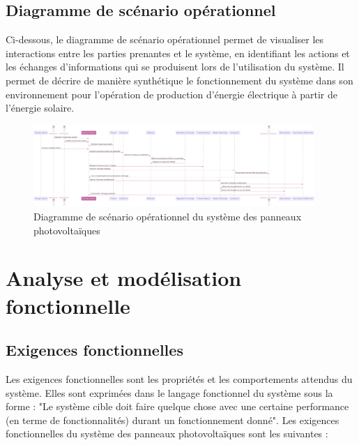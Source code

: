 \documentclass{article}
\begin{document}
\subsection{Diagramme de scénario opérationnel}
Ci-dessous, le diagramme de scénario opérationnel permet de visualiser les interactions entre les parties prenantes et le système, en identifiant les actions et les échanges d'informations qui se produisent lors de l'utilisation du système. Il permet de décrire de manière synthétique le fonctionnement du système dans son environnement pour l'opération de production d'énergie électrique à partir de l'énergie solaire. 
\vspace{10pt}
\begin{figure}[H]
    \centering
    \includegraphics[width=0.95\textwidth]{diagramme_de_scenario_operationnel.png}
    \caption{Diagramme de scénario opérationnel du système des panneaux photovoltaïques}
    \label{fig:diagramme_contexte}
\end{figure}
\vspace{10pt}


\section{Analyse et modélisation fonctionnelle}



\subsection{Exigences fonctionnelles}
Les exigences fonctionnelles sont les propriétés et les comportements attendus du système. Elles sont exprimées dans le langage fonctionnel du système sous la forme : "Le système cible doit faire quelque chose avec une certaine performance (en terme de fonctionnalités) durant un fonctionnement donné". Les exigences fonctionnelles du système des panneaux photovoltaïques sont les suivantes : 
\end{document}
